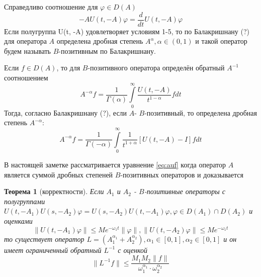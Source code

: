 \documentclass{article}
\newtheorem{theorem}{Теорема}
\begin{document}
Справедливо соотношение для $\varphi \in D(A)$
\begin{equation}
    -A U(t, -A)\varphi = \frac{d}{dt} U(t, -A)\varphi
\end{equation}
Если полугруппа U(t, -A) удовлетворяет условиям 1-5, то по Балакришнану (?) для оператора $A$ определена
дробная степень $A^\alpha, \alpha \in (0, 1)$ и такой оператор будем называть $B$-позитивным по
Балакришнану.

Если $f \in D(A)$, то для $B$-позитивного оператора определён обратный $A^{-1}$ соотношением
\begin{equation}
    A^{-\alpha}f = \frac{1}{\Gamma(\alpha)} \int\limits_0^\infty \frac{U(t, -A)}{t^{1-\alpha}} fdt
\end{equation}
Тогда, согласно Балакришнану (?), если $A$- $B$-позитивный, то определена дробная степень $A^{-\alpha}$:
\begin{equation}
    A^{-\alpha}f = \frac{1}{\Gamma(-\alpha)} \int\limits_0^\infty \frac{1}{t^{1 + \alpha}} [U(t, -A) - I] fdt
\end{equation}

В настоящей заметке рассматривается уравнение \eqref{eq:auf} когда оператор $A$ является суммой дробных степеней
$B$-позитивных операторов и доказывается

\begin{theorem}[корректности]
    Если $A_1$ и $A_2$ - $B$-позитивные операторы с полугруппами
    $U(t, -A_1)U(s, -A_2)\varphi = U(s, -A_2)U(t, -A_1)\varphi, \varphi \in D(A_1) \cap D(A_2)$ и оценками
    \begin{equation}
        \|U(t, -A_1)\varphi\| \le Me^{-\omega_1 t} \|\varphi\|, \|U(t, -A_2)\varphi\| \le Me^{-\omega_1 t}
    \end{equation}
    то существует оператор $L = (A_1^{\alpha_1} + A_2^{\alpha_2}), \alpha_1 \in [0, 1], \alpha_2 \in [0, 1]$
    и он имеет ограниченный обратный $L^{-1}$ с оценкой
    \begin{equation}
        \|L^{-1}f\| \le \frac{M_1 M_2 \|f\|}{\omega_1^{\alpha_1} \cdot \omega_2^{\alpha_2}}
    \end{equation}
\end{theorem}
\end{document}
